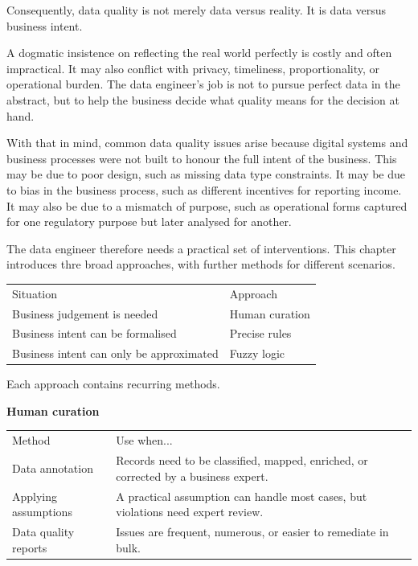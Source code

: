 \documentclass[10pt,openany,10pt]{book}
\newcounter{none}
\let\podeToprule\toprule
\let\podeMidrule\midrule
\let\podeBottomrule\bottomrule
\renewcommand{\toprule}{\arrayrulecolor{pbiGrid}\podeToprule}
\renewcommand{\midrule}{\arrayrulecolor{pbiGrid}\podeMidrule}
\renewcommand{\bottomrule}{\arrayrulecolor{pbiGrid}\podeBottomrule}
\begin{document}
Consequently, data quality is not merely data versus reality. It is data
versus business intent.

A dogmatic insistence on reflecting the real world perfectly is costly
and often impractical. It may also conflict with privacy, timeliness,
proportionality, or operational burden. The data engineer's job is not
to pursue perfect data in the abstract, but to help the business decide
what quality means for the decision at hand.

With that in mind, common data quality issues arise because digital
systems and business processes were not built to honour the full intent
of the business. This may be due to poor design, such as missing data
type constraints. It may be due to bias in the business process, such as
different incentives for reporting income. It may also be due to a
mismatch of purpose, such as operational forms captured for one
regulatory purpose but later analysed for another.

The data engineer therefore needs a practical set of interventions. This
chapter introduces thre broad approaches, with further methods for
different scenarios.

{\def\LTcaptype{none} %
\begin{longtable}[]{@{}ll@{}}
\toprule\noalign{}
Situation & Approach \\
\midrule\noalign{}
\endhead
\bottomrule\noalign{}
\endlastfoot
Business judgement is needed & Human curation \\
Business intent can be formalised & Precise rules \\
Business intent can only be approximated & Fuzzy logic \\
\end{longtable}
}

Each approach contains recurring methods.

\textbf{Human curation}

{\def\LTcaptype{none} %
\begin{longtable}[]{@{}
  >{\raggedright\arraybackslash}p{}
  >{\raggedright\arraybackslash}p{}@{}}
\toprule\noalign{}
\begin{minipage}[b]{\linewidth}\raggedright
Method
\end{minipage} & \begin{minipage}[b]{\linewidth}\raggedright
Use when...
\end{minipage} \\
\midrule\noalign{}
\endhead
\bottomrule\noalign{}
\endlastfoot
Data annotation & Records need to be classified, mapped, enriched, or
corrected by a business expert. \\
Applying assumptions & A practical assumption can handle most cases, but
violations need expert review. \\
Data quality reports & Issues are frequent, numerous, or easier to
remediate in bulk. \\
\end{longtable}
}
\end{document}
